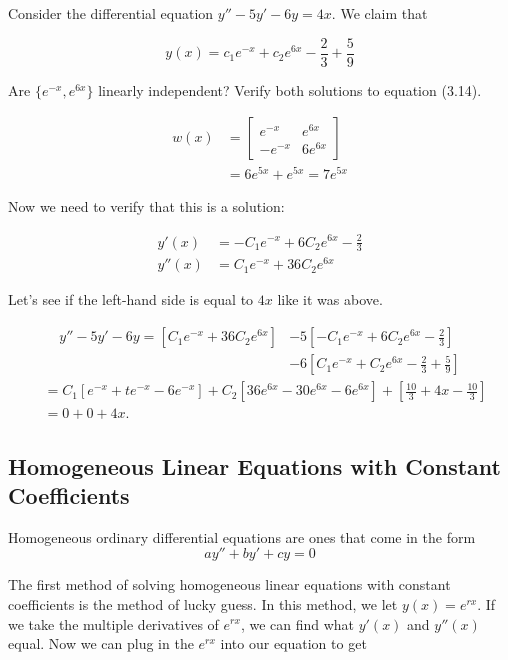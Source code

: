  \begin{eg}
    Consider the differential equation $y''-5y'-6y=4x$. We claim that 

    \[
      y(x)=c_1e^{-x}+c_2e^{6x}-\frac{2}{3}+\frac{5}{9}
    \]

    Are $\{e^{-x},e^{6x}\}$ linearly independent? Verify both solutions to equation (3.14).

    \begin{align*}
      w(x)&=\begin{bmatrix} e^{-x}&e^{6x}\\-e^{-x}&6e^{6x} \end{bmatrix} \\
          &=6e^{5x}+e^{5x}=7e^{5x}
    \end{align*}

    Now we need to verify that this is a solution:

    \begin{align*}
      y'(x)&=-C_1e^{-x}+6C_2e^{6x}-\frac{2}{3}\\
      y''(x)&=C_1e^{-x}+36C_2e^{6x}
    \end{align*}

     Let's see if the left-hand side is equal to $4x$ like it was above.

     \begin{align*}
       y''-5y'-6y=\left[C_1e^{-x}+36C_2e^{6x}\right]&-5\left[-C_1e^{-x}+6C_2e^{6x}-\frac{2}{3}\right]\\
                                                    &-6\left[C_1e^{-x}+C_2e^{6x}-\frac{2}{3}+\frac{5}{9}\right]
     \end{align*}
     \begin{align*}
       &=C_1[e^{-x}+te^{-x}-6e^{-x}]+C_2[36e^{6x}-30e^{6x}-6e^{6x}]+\left[\frac{10}{3}+4x-\frac{10}{3}\right]\\
       &=0+0+4x
     .\end{align*}

  \end{eg}

\subsection{Homogeneous Linear Equations with Constant Coefficients}

  Homogeneous ordinary differential equations are ones that come in the form 
  \[
    ay''+by'+cy=0
  \]

  The first method of solving homogeneous linear equations with constant coefficients is the method of lucky guess. In this method, we let $y(x)=e^{rx}$. If we take the multiple derivatives of $e^{rx}$, we can find what $y'(x)$ and $y''(x)$ equal. Now we can plug in the $e^{rx}$ into our equation to get 

